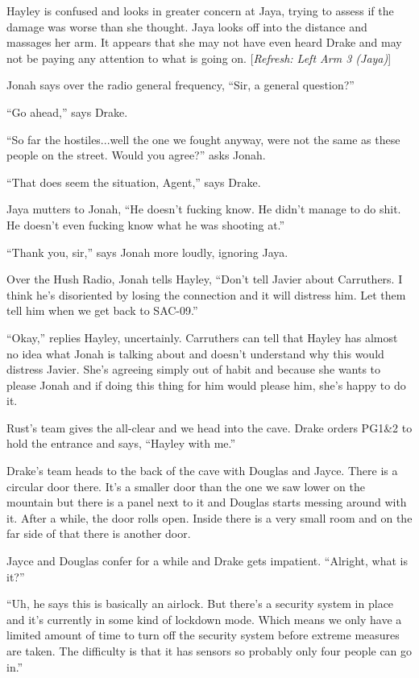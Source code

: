 Hayley is confused and looks in greater concern at Jaya, trying to assess if the damage was worse than she thought.  Jaya looks off into the distance and massages her arm.  It appears that she may not have even heard Drake and may not be paying any attention to what is going on. {[}\textit{Refresh: Left Arm 3 (Jaya)}{]}

Jonah says over the radio general frequency, ``Sir, a general question?''

``Go ahead,'' says Drake.

``So far the hostiles...well the one we fought anyway, were not the same as these people on the street.  Would you agree?'' asks Jonah.

``That does seem the situation, Agent,'' says Drake.

Jaya mutters to Jonah, ``He doesn't fucking know.  He didn't manage to do shit.  He doesn't even fucking know what he was shooting at.''

``Thank you, sir,'' says Jonah more loudly, ignoring Jaya.



Over the Hush Radio, Jonah tells Hayley, ``Don't tell Javier about Carruthers.  I think he's disoriented by losing the connection and it will distress him.  Let them tell him when we get back to SAC-09.''

``Okay,'' replies Hayley, uncertainly.  Carruthers can tell that Hayley has almost no idea what Jonah is talking about and doesn't understand why this would distress Javier.  She's agreeing simply out of habit and because she wants to please Jonah and if doing this thing for him would please him, she's happy to do it.



Rust's team gives the all-clear and we head into the cave.   Drake orders PG1\&2 to hold the entrance and says, ``Hayley with me.''

Drake's team heads to the back of the cave with Douglas and Jayce.  There is a circular door there.  It's a smaller door than the one we saw lower on the mountain but there is a panel next to it and Douglas starts messing around with it.  After a while, the door rolls open.  Inside there is a very small room and on the far side of that there is another door.

Jayce and Douglas confer for a while and Drake gets impatient.  ``Alright, what is it?''

``Uh, he says this is basically an airlock.  But there's a security system in place and it's currently in some kind of lockdown mode.  Which means we only have a limited amount of time to turn off the security system before extreme measures are taken.  The difficulty is that it has sensors so probably only four people can go in.''


